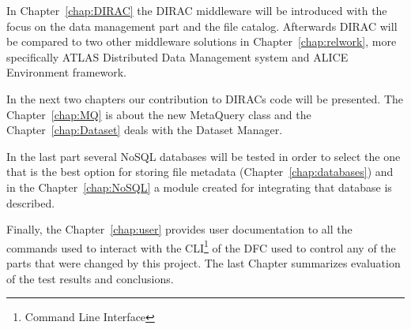 In Chapter~\ref{chap:DIRAC} the DIRAC middleware will be introduced with the focus on the data management part and the 
file catalog. Afterwards DIRAC will be compared to two other middleware solutions in Chapter~\ref{chap:relwork}, 
more specifically ATLAS Distributed Data Management system and ALICE Environment framework.

In the next two chapters our contribution to DIRACs code will be presented. The Chapter~\ref{chap:MQ} 
is about the new MetaQuery class and the Chapter~\ref{chap:Dataset} deals with the Dataset Manager.

In the last part several NoSQL databases will be tested in order to select the one that is the best option for storing
file metadata (Chapter~\ref{chap:databases}) and in the Chapter~\ref{chap:NoSQL} a module created for integrating 
that database is described. 

Finally, the Chapter~\ref{chap:user} provides user documentation to all the commands used to interact with the 
CLI\footnote{Command Line Interface}
of the DFC used to control any of the parts that were changed by this project. The last Chapter
summarizes evaluation of the test results and conclusions.
